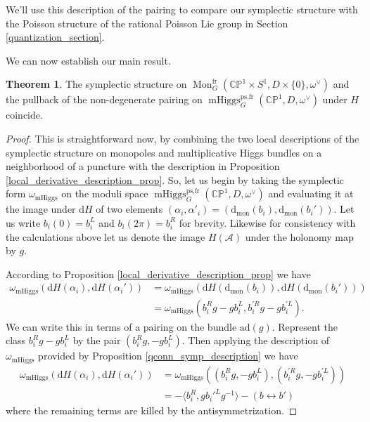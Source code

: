 \documentclass[11pt, oneside, reqno]{amsart}
\theoremstyle{definition} \newtheorem{definition}{Definition}[section]
\newtheorem{theorem}[definition]{Theorem}
\theoremstyle{definition} \newtheorem{remark}[definition]{Remark}
\theoremstyle{definition} \newtheorem{remarks}[definition]{Remarks}
\theoremstyle{definition} \newtheorem{question}[definition]{Question}
\theoremstyle{definition} \newtheorem*{note}{Note}
\theoremstyle{definition} \newtheorem{example}[definition]{Example}
\theoremstyle{definition} \newtheorem{examples}[definition]{Examples}
\newcommand{\bb}[1]{\mathbb{#1}}
\newcommand{\mr}[1]{\mathrm{#1}}
\newcommand{\mc}[1]{\mathcal{#1}}
\DeclareMathOperator{\mhiggs}{mHiggs}
\DeclareMathOperator{\mon}{Mon}
\renewcommand{\d}{\mathrm{d}}
\newcommand{\fr}{\mathrm{fr}}
\newcommand{\ad}{\mr{ad}}
\begin{document}
We'll use this description of the pairing to compare our symplectic structure with the Poisson structure of the rational Poisson Lie group in Section \ref{quantization_section}.

We can now establish our main result.
\begin{theorem} \label{symplectic_comparison_thm}
The symplectic structure on $\mon_G^\fr(\bb{CP}^1 \times S^1,D \times\{0\},\omega^\vee)$ and the pullback of the non-degenerate pairing on $\mhiggs_G^{\text{ps,fr}}(\bb{CP}^1,D,\omega^\vee)$ under $H$ coincide.
\end{theorem}

\begin{proof}
This is straightforward now, by combining the two local descriptions of the symplectic structure on monopoles and multiplicative Higgs bundles on a neighborhood of a puncture with the description in Proposition \ref{local_derivative_description_prop}.  So, let us begin by taking the symplectic form $\omega_{\mr{mHiggs}}$ on the moduli space $\mhiggs_G^{\text{ps,fr}}(\bb{CP}^1,D,\omega^\vee)$ and evaluating it at the image under $\d H$ of two elements $(\alpha_i, \alpha'_i) = (\d_{\mr{mon}}(b_i), \d_{\mr{mon}}(b_i'))$.  Let us write $b_i(0) = b_i^L$ and $b_i(2\pi) = b_i^R$ for brevity.  Likewise for consistency with the calculations above let us denote the image $H(\mc A)$ under the holonomy map by $g$.

According to Proposition \ref{local_derivative_description_prop} we have
\begin{align*}
\omega_{\mr{mHiggs}}(\d H(\alpha_i), \d H(\alpha_i')) &= \omega_{\mr{mHiggs}}(\d H(\d_{\mr{mon}}(b_i)), \d H(\d_{\mr{mon}}(b_i'))) \\
&= \omega_{\mr{mHiggs}}(b_i^Rg - gb_i^L,b_i^{'R}g - gb_i^{'L}).
\end{align*}
We can write this in terms of a pairing on the bundle $\ad(g)$.  Represent the class $b_i^Rg - gb_i^L$ by the pair $(b_i^Rg, -gb_i^L)$.  Then applying the description of $\omega_{\mr{mHiggs}}$ provided by Proposition \ref{qconn_symp_description} we have
\begin{align*}
\omega_{\mr{mHiggs}}(\d H(\alpha_i), \d H(\alpha_i')) &= \omega_{\mr{mHiggs}}((b_i^Rg, -gb_i^L),(b_i^{'R}g, -gb_i^{'L})) \\ 
&= - \langle  b_i^R , g b_i'^L g^{-1}\rangle - (b \leftrightarrow b')
\end{align*}
where the remaining terms are killed by the antisymmetrization.


\end{proof}
\end{document}

